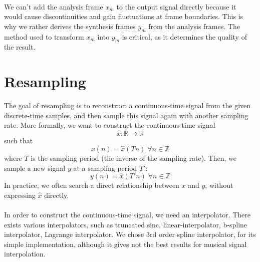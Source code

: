 \documentclass[letterpaper]{article}
\begin{document}
\paragraph{}
We can't add the analysis frame \(x_m\) to the output signal directly because it
would cause discontinuities and gain fluctuations at frame boundaries. This is
why we rather derives the synthesis frames \(y_m\) from the analysis frames.
The method used to transform \(x_m\) into \(y_m\) is
critical, as it determines the quality of the result.

\section{Resampling}
The goal of resampling is to reconstruct a continuous-time signal from the given
discrete-time samples, and then sample this signal again with another sampling
rate. More formally, we want to construct the continuous-time signal
\[\hat x:\mathbb{R}\to\mathbb{R}\]
such that
\[x(n) = \hat x(Tn) \;\forall n\in\mathbb{Z}\]
where \(T\) is the sampling period (the inverse of the sampling rate). Then, we
sample a new signal \(y\) at a sampling period \(T'\):
\[y(n) = \hat x(T'n) \;\forall n\in\mathbb{Z}\]
In practice, we often search a direct relationship between \(x\) and \(y\),
without expressing \(\hat x\) directly.
\paragraph{}
In order to construct the continuous-time signal, we need an interpolator. There
exists various interpolators, such as truncated sinc, linear-interpolator,
b-spline interpolator, Lagrange interpolator. We chose 3rd order spline
interpolator, for its simple implementation, although it gives not the best
results for musical signal interpolation.
\end{document}
